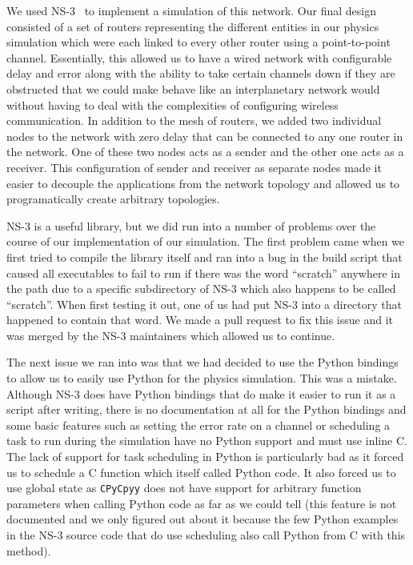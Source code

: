 \documentclass[a4paper,12pt]{article}
\newcommand{\CC}{C\nolinebreak\hspace{-.05em}\raisebox{.4ex}{\tiny\bf +}\nolinebreak\hspace{-.10em}\raisebox{.4ex}{\tiny\bf +}}
\def\CC{{C\nolinebreak[4]\hspace{-.05em}\raisebox{.4ex}{\tiny\bf ++}}}
\begin{document}
We used NS-3~\cite{ns-3} to implement a simulation of this network. Our final design
consisted of a set of routers representing the different entities in our physics
simulation which were each linked to every other router using a point-to-point
channel. Essentially, this allowed us to have a wired network with configurable
delay and error along with the ability to take certain channels down if they are
obstructed that we could make behave like an interplanetary network would
without having to deal with the complexities of configuring wireless
communication. In addition to the mesh of routers, we added two individual nodes
to the network with zero delay that can be connected to any one router in the
network. One of these two nodes acts as a sender and the other one acts as a
receiver. This configuration of sender and receiver as separate nodes made it
easier to decouple the applications from the network topology and allowed us to
programatically create arbitrary topologies.

NS-3 is a useful library, but we did run into a number of problems over the
course of our implementation of our simulation. The first problem came when we
first tried to compile the library itself and ran into a bug in the build script
that caused all executables to fail to run if there was the word ``scratch''
anywhere in the path due to a specific subdirectory of NS-3 which also happens
to be called ``scratch''. When first testing it out, one of us had put NS-3 into
a directory that happened to contain that word. We made a pull request to fix
this issue and it was merged by the NS-3 maintainers which allowed us to
continue.

The next issue we ran into was that we had decided to use the Python bindings to
allow us to easily use Python for the physics simulation. This was a mistake.
Although NS-3 does have Python bindings that do make it easier to run it as a
script after writing, there is no documentation at all for the Python bindings
and some basic features such as setting the error rate on a channel or
scheduling a task to run during the simulation have no Python support and must
use inline \CC. The lack of support for task scheduling in Python is
particularly bad as it forced us to schedule a \CC{} function which itself
called Python code. It also forced us to use global state as \texttt{CPyCpyy}
does not have support for arbitrary function parameters when calling Python code
as far as we could tell (this feature is not documented and we only figured out
about it because the few Python examples in the NS-3 source code that do use
scheduling also call Python from \CC{} with this method).
\end{document}

